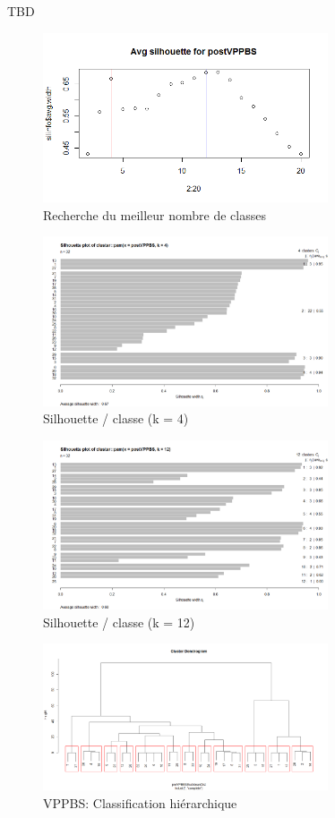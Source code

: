 %
%


TBD

\begin{figure}[H]
\centering
\includegraphics[width=0.75\textwidth]{../Fig/VPPBS/vppbs-elbow-post.png}
\caption{Recherche du meilleur nombre de classes}
\end{figure}

\begin{figure}[H]
\centering
\includegraphics[width=0.75\textwidth]{../Fig/VPPBS/vppbs-sil-k4-post.png}
\caption{Silhouette / classe (k = 4)}
\end{figure}

\begin{figure}[H]
\centering
\includegraphics[width=0.75\textwidth]{../Fig/VPPBS/vppbs-sil-k12-post.png}
\caption{Silhouette / classe (k = 12)}
\end{figure}

\begin{figure}[H]
\centering
\includegraphics[width=0.75\textwidth]{../Fig/VPPBS/vppbs-cah-12k.png}
\caption{VPPBS: Classification hiérarchique}
\end{figure}

%
